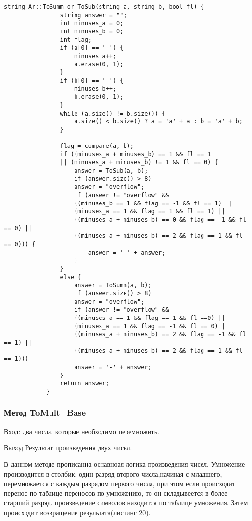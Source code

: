 \documentclass[10pt,a4paper,final]{article} %
\begin{document}
		\begin{lstlisting}[caption={Метод ToSumm\_or\_ToSub}]
			string Ar::ToSumm_or_ToSub(string a, string b, bool fl) {
				string answer = "";
				int minuses_a = 0;
				int minuses_b = 0;
				int flag;
				if (a[0] == '-') {
					minuses_a++;
					a.erase(0, 1);
				}
				if (b[0] == '-') {
					minuses_b++;
					b.erase(0, 1);
				}
				while (a.size() != b.size()) {
					a.size() < b.size() ? a = 'a' + a : b = 'a' + b;
				}
				
				flag = compare(a, b);
				if ((minuses_a + minuses_b) == 1 && fl == 1
				|| (minuses_a + minuses_b) != 1 && fl == 0) {
					answer = ToSub(a, b);
					if (answer.size() > 8)
					answer = "overflow";
					if (answer != "overflow" &&
					((minuses_b == 1 && flag == -1 && fl == 1) ||
					(minuses_a == 1 && flag == 1 && fl == 1) ||
					((minuses_a + minuses_b) == 0 && flag == -1 && fl == 0) ||
					((minuses_a + minuses_b) == 2 && flag == 1 && fl == 0))) {
						answer = '-' + answer;
					}
				}
				else {
					answer = ToSumm(a, b);
					if (answer.size() > 8)
					answer = "overflow";
					if (answer != "overflow" &&
					((minuses_a == 1 && flag == 1 && fl ==0) ||
					(minuses_a == 1 && flag == -1 && fl == 0) ||
					((minuses_a + minuses_b) == 2 && flag == -1 && fl == 1) ||
					((minuses_a + minuses_b) == 2 && flag == 1 && fl == 1)))
					answer = '-' + answer;
				}
				return answer;
			}
		\end{lstlisting}
		
		
			\subsubsection{Метод ToMult\_Base}
			
			Вход: два числа, которые необходимо перемножить.
			
			Выход Результат произведения двух чисел.
			
			В данном методе прописанна оснавноая логика произведения чисел. Умножение производится в столбик: один разряд второго числа,начиная с младшего, перемножается с каждым разрядом первого числа, при этом если происходит перенос по таблице переносов по умножению, то он складывеется в более старший разряд. произведение символов находится по таблице умножения. Затем происходит возвращение результата(листинг 20).
			
\end{document}
